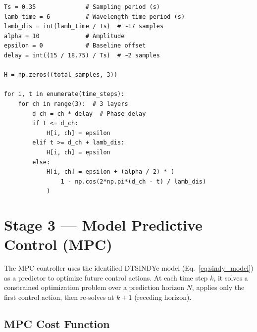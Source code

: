 \documentclass[11pt,a4paper]{article}
\begin{document}
\begin{codebox}
\begin{lstlisting}
Ts = 0.35              # Sampling period (s)
lamb_time = 6          # Wavelength time period (s)
lamb_dis = int(lamb_time / Ts)  # ~17 samples
alpha = 10             # Amplitude
epsilon = 0            # Baseline offset
delay = int((15 / 18.75) / Ts)  # ~2 samples

H = np.zeros((total_samples, 3))

for i, t in enumerate(time_steps):
    for ch in range(3):  # 3 layers
        d_ch = ch * delay  # Phase delay
        if t <= d_ch:
            H[i, ch] = epsilon
        elif t >= d_ch + lamb_dis:
            H[i, ch] = epsilon
        else:
            H[i, ch] = epsilon + (alpha / 2) * (
                1 - np.cos(2*np.pi*(d_ch - t) / lamb_dis)
            )
\end{lstlisting}
\end{codebox}

\section{Stage 3 --- Model Predictive Control (MPC)}
\label{sec:mpc}

\begin{conceptbox}
The MPC controller uses the identified DTSINDYc model (Eq.~\ref{eq:sindy_model})
as a predictor to optimize future control actions. At each time step $k$, it
solves a constrained optimization problem over a prediction horizon $N$, applies
only the first control action, then re-solves at $k+1$ (receding horizon).
\end{conceptbox}

\subsection{MPC Cost Function}
\end{document}
